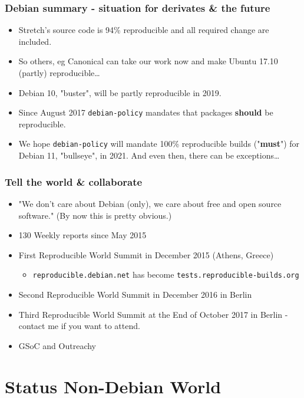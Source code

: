 \documentclass[14pt,aspectratio=169]{beamer}
\begin{document}
\begin{frame}
	\frametitle{Debian summary - situation for derivates \& the future}
 \begin{itemize}
  \item Stretch's source code is 94\% reproducible and all required change are included.
  \item So others, eg Canonical can take our work now and make Ubuntu 17.10
  (partly) reproducible…
  \item<2-4> Debian 10, "buster", will be partly reproducible in 2019.
  \item<3-4> Since August 2017 \texttt{debian-policy} mandates that packages \textbf{should} be reproducible.
  \item<4> We hope \texttt{debian-policy} will mandate 100\%
	  reproducible builds ("\textbf{must}") for Debian 11, "bullseye", in 2021. And even then, there can be exceptions…
 \end{itemize}
\end{frame}

\begin{frame}
 \frametitle{Tell the world \& collaborate}

 \begin{itemize}
  \item "We don't care about Debian (only), we care about free and open
	  source software." (By now this is pretty obvious.)
  \item<2-4> 130 Weekly reports since May 2015
  \item<3-4> First Reproducible World Summit in December 2015 (Athens, Greece)
   \begin{itemize}
    \item<3-4> \texttt{reproducible.debian.net} has become \texttt{tests.reproducible-builds.org}
   \end{itemize}
    \item<3-4> Second Reproducible World Summit in December 2016 in Berlin
    \item<3-4> Third Reproducible World Summit at the End of October 2017 in Berlin - contact me if you want to attend.
   \item<4> GSoC and Outreachy
 \end{itemize}
\end{frame}



\section{Status Non-Debian World}
\end{document}
